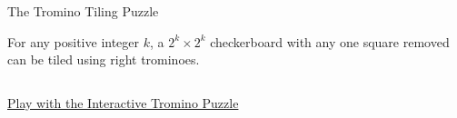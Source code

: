 \begin{frame}{}
  \centerline{\LARGE The Tromino Tiling Puzzle}
\end{frame}

\begin{frame}{}
  \begin{theorem}
    For any positive integer $k$, 
    a $2^k \times 2^k$ checkerboard with any one square removed 
    can be tiled using right trominoes.
  \end{theorem}

  \vspace{0.30cm}
  \begin{columns}
  \end{columns}

  \vspace{0.80cm}
  \centerline{{\Large {}} \href{http://www3.amherst.edu/~nstarr/puzzle.html}{Play with the Interactive Tromino Puzzle}}
\end{frame}

\begin{frame}{}

  \centerline{}
\end{frame}
